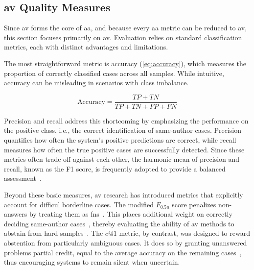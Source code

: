 \subsection{\ac{av} Quality Measures}
\label{subsec:av_quality_measures}

Since \ac{av} forms the core of \ac{aa}, and because every \ac{aa} metric can be reduced to \ac{av}, this section focuses primarily on \ac{av}. 
Evaluation relies on standard classification metrics, each with distinct advantages and limitations.

The most straightforward metric is accuracy (\autoref{eq:accuracy}), which measures the proportion of correctly classified cases across all samples. 
While intuitive, accuracy can be misleading in scenarios with class imbalance. 

\begin{equation}\label{eq:accuracy}
    \text{Accuracy} = \frac{TP + TN}{TP + TN + FP + FN}
\end{equation}

Precision and recall address this shortcoming by emphasizing the performance on the positive class, i.e., the correct identification of same-author cases. 
Precision quantifies how often the system’s positive predictions are correct, while recall measures how often the true positive cases are successfully detected. 
Since these metrics often trade off against each other, the harmonic mean of precision and recall, known as the F1 score, is frequently adopted to provide a balanced assessment~\citep{neal_surveying_2018}.

Beyond these basic measures, \ac{av} research has introduced metrics that explicitly account for difficul borderline cases. 
The modified $F_{0.5u}$ score penalizes non-answers by treating them as \acp{fn}~\citep{bevendorff_overview_2024}. 
This places additional weight on correctly deciding same-author cases~\citep{weerasinghe_feature_vector_difference_2021}, thereby evaluating the ability of \ac{av} methods to abstain from hard samples~\citep{tyo_state_2022}. 
The $c@1$ metric, by contrast, was designed to reward abstention from particularly ambiguous cases. 
It does so by granting unanswered problems partial credit, equal to the average accuracy on the remaining cases~\citep{bevendorff_overview_2024}, thus encouraging systems to remain silent when uncertain.

